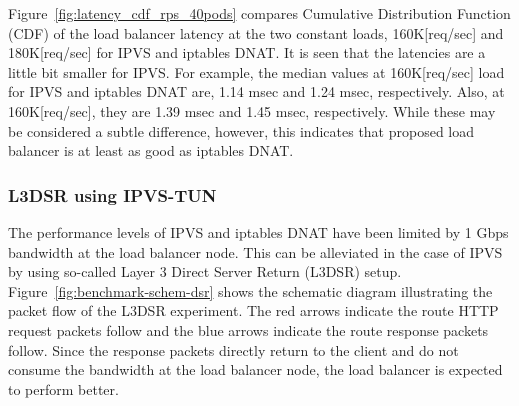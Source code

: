 Figure~\ref{fig:latency_cdf_rps_40pods} compares Cumulative Distribution Function (CDF) of the load balancer latency at the two constant loads, 160K[req/sec] and 180K[req/sec] for IPVS and iptables DNAT.
It is seen that the latencies are a little bit smaller for IPVS.
For example, the median values at 160K[req/sec] load for IPVS and iptables DNAT are, 1.14 msec and 1.24 msec, respectively.
Also, at 160K[req/sec], they are 1.39 msec and 1.45 msec, respectively.
%
While these may be considered a subtle difference, however, this indicates that proposed load balancer is at least as good as iptables DNAT.




\FloatBarrier

\subsubsection{L3DSR using IPVS-TUN}

The performance levels of IPVS and iptables DNAT have been limited by 1 Gbps bandwidth at the load balancer node.
This can be alleviated in the case of IPVS by using so-called Layer 3 Direct Server Return (L3DSR) setup.
Figure~\ref{fig:benchmark-schem-dsr} shows the schematic diagram illustrating the packet flow of the L3DSR experiment.
The red arrows indicate the route HTTP request packets follow and the blue arrows indicate the route response packets follow.
Since the response packets directly return to the client and do not consume the bandwidth at the load balancer node, the load balancer is expected to perform better.

